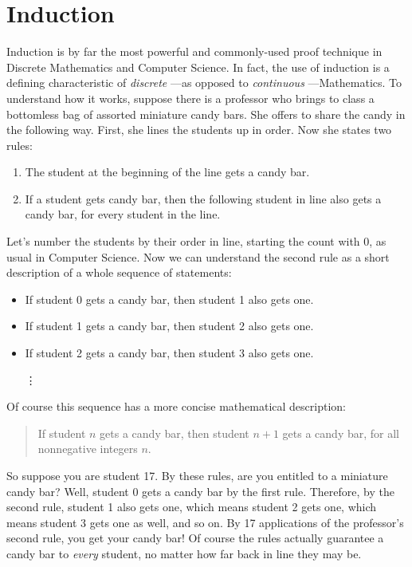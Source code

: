 \chapter{Induction}

Induction is by far the most powerful and commonly-used proof technique in
Discrete Mathematics and Computer Science.  In fact, the use of induction
is a defining characteristic of \emph{discrete} ---as opposed to
\emph{continuous} ---Mathematics.
%
To understand how it works, suppose there is a professor who brings
to class a bottomless bag of assorted miniature candy bars.  She offers to
share the candy in the following way.  First, she lines the students up in
order.  Now she states two rules:

\begin{enumerate}
\item The student at the beginning of the line gets a candy bar.
\item If a student gets candy bar, then the following student in line
  also gets a candy bar, for every student in the line.
\end{enumerate}
%
Let's number the students by their order in line, starting the count with
0, as usual in Computer Science.  Now we can understand the second rule as
a short description of a whole sequence of statements:
%
\begin{itemize}
\item If student 0 gets a candy bar, then student 1 also gets one.
\item If student 1 gets a candy bar, then student 2 also gets one.
\item If student 2 gets a candy bar, then student 3 also gets one.

\hspace{1.2in} \vdots
\end{itemize}
%
Of course this sequence has a more concise mathematical description:
\begin{quote}
  If student $n$ gets a candy bar, then student $n+1$ gets a
  candy bar, for all nonnegative integers $n$.
\end{quote}
So suppose you are student 17.  By these rules, are you entitled to a
miniature candy bar?  Well, student 0 gets a candy bar by the first rule.
Therefore, by the second rule, student 1 also gets one, which means
student 2 gets one, which means student 3 gets one as well, and so on.  By
17 applications of the professor's second rule, you get your candy bar!
Of course the rules actually guarantee a candy bar to \emph{every}
student, no matter how far back in line they may be.


